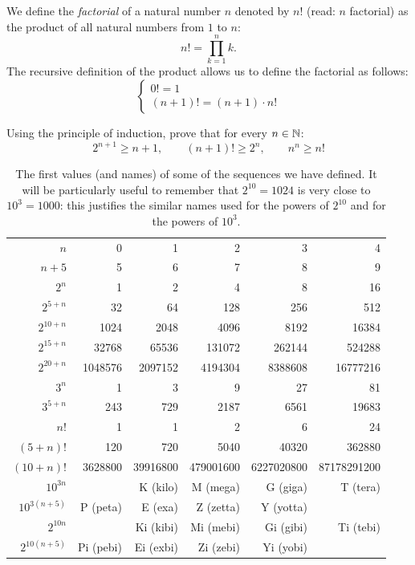 We define the 
\emph{factorial}%
%
%
%
of a natural number $n$
denoted by $n!$ (read: $n$ factorial) 
as the product of all natural numbers from $1$ to $n$:
\[
  n! = \prod_{k=1}^n k.
\]
The recursive definition of the product allows us to define the factorial
as follows:
\[
  \begin{cases}
    0! = 1 \\
    (n+1)! = (n+1) \cdot n!
  \end{cases}
\]

\begin{exercise}
  \label{ex:6734098}%
  Using the principle of induction,
  prove that for every $n\in {\mathbb N}$:
  \[
    2^{n+1} \ge n+1, \qquad
    (n+1)! \ge 2^n, \qquad
    n^n \ge n!
  \]
\end{exercise}

\begin{table}
  \begin{center}
  \begin{tabular}{r|>{\small}r>{\small}r>{\small}r>{\small}r>{\small}r}
  $n$       & 0 & 1 & 2 & 3 & 4 \\
  \footnotesize $n+5$     & 5 & 6 & 7 & 8 & 9 \\ \hline
  $2^n$     & 1 & 2 & 4 & 8 & 16 \\
  \footnotesize $2^{5+n}$ & 32 & 64 & 128 & 256 & 512 \\
  \footnotesize $2^{10+n}$ & 1024 & 2048 & 4096 & 8192 & 16384 \\
  \footnotesize $2^{15+n}$ & 32768 & 65536 & 131072 & 262144 & 524288 \\
  \footnotesize $2^{20+n}$ & 1048576 & 2097152 & 4194304 & 8388608 & 16777216 \\  \hline
  $3^n$                    & 1 & 3 & 9 & 27 & 81 \\
  \footnotesize $3^{5+n}$  & 243 & 729 & 2187 & 6561 & 19683 \\  \hline
  $n!$      & 1 & 1 & 2 & 6 & 24 \\
  \footnotesize $(5+n)!$  & 120 & 720 & 5040 & 40320 & 362880 \\
  \footnotesize $(10+n)!$  & 3628800 & 39916800 & 479001600 & 6227020800 & 87178291200 \\ \hline
  \footnotesize $10^{3n}$  &  & K (kilo) & M (mega) & G (giga) & T (tera) \\ 
  \footnotesize $10^{3(n+5)}$  & P (peta) & E (exa) & Z (zetta) & Y (yotta) \\ \hline
  \footnotesize $2^{10n}$  &  & Ki (kibi) & Mi (mebi) & Gi (gibi) & Ti (tebi) \\
  \footnotesize $2^{10(n+5)}$ & Pi (pebi)& Ei (exbi) & Zi (zebi) & Yi (yobi)
  \end{tabular}
  \end{center}
  \caption{The first values (and names) of some of the sequences we have defined.
  It will be particularly useful to remember that $2^{10}=1024$ 
  is very close to $10^3=1000$: this justifies the similar names used
  for the powers of $2^{10}$ and for the powers of $10^3$.
  }
  \end{table}
  
